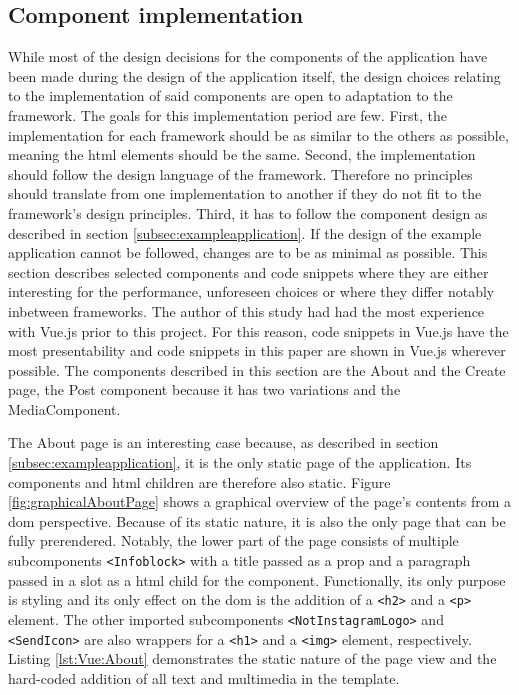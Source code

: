 \documentclass[a4paper, 12pt]{article}
\begin{document}
\subsection{Component implementation}\label{subsec:components}
% 

While most of the design decisions for the components of the application have been made during the design of the application itself, the design choices relating to the implementation of said components are open to adaptation to the framework.
The goals for this implementation period are few.
First, the implementation for each framework should be as similar to the others as possible, meaning the \acrshort{html} elements should be the same.
Second, the implementation should follow the design language of the framework.
Therefore no principles should translate from one implementation to another if they do not fit to the framework's design principles.
Third, it has to follow the component design as described in section \ref{subsec:exampleapplication}.
If the design of the example application cannot be followed, changes are to be as minimal as possible.
This section describes selected components and code snippets where they are either interesting for the performance, unforeseen choices or where they differ notably inbetween frameworks.
The author of this study had had the most experience with Vue.js prior to this project.
For this reason, code snippets in Vue.js have the most presentability and code snippets in this paper are shown in Vue.js wherever possible.
The components described in this section are the About and the Create page, the Post component because it has two variations and the MediaComponent.

The About page is an interesting case because, as described in section \ref{subsec:exampleapplication}, it is the only static page of the application.
Its components and \acrshort{html} children are therefore also static.
Figure \ref{fig:graphicalAboutPage} shows a graphical overview of the page's contents from a \acrshort{dom} perspective.
Because of its static nature, it is also the only page that can be fully prerendered.
Notably, the lower part of the page consists of multiple subcomponents \verb|<Infoblock>| with a title passed as a prop and a paragraph passed in a slot as a \acrshort{html} child for the component.
Functionally, its only purpose is styling and its only effect on the \acrshort{dom} is the addition of a \verb|<h2>| and a \verb|<p>| element.
The other imported subcomponents \verb|<NotInstagramLogo>| and \verb|<SendIcon>| are also wrappers for a \verb|<h1>| and a \verb|<img>| element, respectively.
Listing \ref{lst:Vue:About} demonstrates the static nature of the page view and the hard-coded addition of all text and multimedia in the template.
\end{document}
